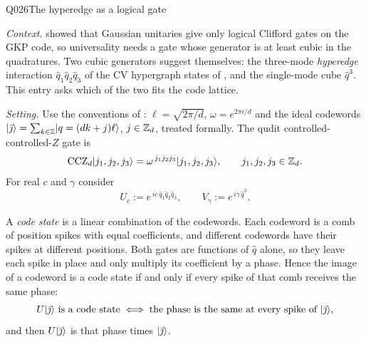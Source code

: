 \begin{entry}{Q026}{The hyperedge as a logical gate}


\begin{problem}
\emph{Context.}  showed that Gaussian unitaries give only logical Clifford
gates on the GKP code, so universality needs a gate whose generator is at least cubic in
the quadratures. Two cubic generators suggest themselves: the three-mode
\emph{hyperedge} interaction $\hat q_1\hat q_2\hat q_3$ of the CV hypergraph states of
, and the single-mode cube $\hat q^{3}$. This entry asks which of the two
fits the code lattice.

\emph{Setting.} Use the conventions of : $\ell=\sqrt{2\pi/d}$,
$\omega=e^{2\pi i/d}$ and the ideal codewords
$\lvert \bar\jmath \rangle=\sum_{k\in\mathbb{Z}}\lvert q=(dk+j)\ell \rangle$, $j\in\mathbb{Z}_d$, treated formally.
The qudit controlled-controlled-$Z$ gate is
\begin{equation}
  \mathrm{CCZ}_d\lvert j_1,j_2,j_3 \rangle=\omega^{\,j_1j_2j_3}\lvert j_1,j_2,j_3 \rangle,
  \qquad j_1,j_2,j_3\in\mathbb{Z}_d .
  \label{q027:ccz}
\end{equation}
For real $c$ and $\gamma$ consider
\begin{equation}
  U_c:=e^{\,ic\,\hat q_1\hat q_2\hat q_3},\qquad V_\gamma:=e^{\,i\gamma\,\hat q^{3}} .
  \label{q027:gates}
\end{equation}

A \emph{code state} is a linear combination of the codewords. Each codeword is a comb of
position spikes with equal coefficients, and different codewords have their spikes at
different positions. Both gates are functions of $\hat q$ alone, so they leave each spike
in place and only multiply its coefficient by a phase. Hence the image of a codeword is
a code state if and only if every spike of that comb receives the same phase:
\begin{equation}
  U\lvert \bar\jmath \rangle\ \text{is a code state}\iff
  \text{the phase is the same at every spike of }\lvert \bar\jmath \rangle,
  \label{q027:reduction}
\end{equation}
and then $U\lvert \bar\jmath \rangle$ is that phase times $\lvert \bar\jmath \rangle$.



\end{problem}
\end{entry}
